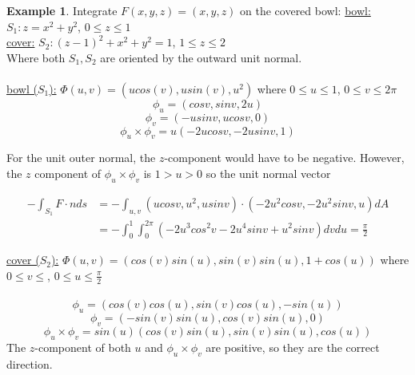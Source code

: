 \documentclass[12pt]{article}
\theoremstyle{plain}
\theoremstyle{definition}
\newtheorem{example}[theorem]{Example}
\begin{document}
\begin{example}
	Integrate $F(x,y,z) = (x,y,z)$ on the covered bowl:
	\underline{bowl:} $S_1 : z = x^2 + y^2$, $0 \leq z \leq 1$\\
	\underline{cover:} $S_2 : (z-1)^2 + x^2 + y^2 =1$, $1 \leq z \leq 2$\\
	Where both $S_1, S_2$ are oriented by the outward unit normal.\\
	\\
	\underline{bowl ($S_1$):} $\Phi (u,v) = (ucos(v), usin(v), u^2)$ where $0 \leq u \leq 1$, $0 \leq v \leq 2 \pi$
	$$\phi_u = (cosv, sinv, 2u)$$
	$$\phi_v = (-usinv, ucosv, 0)$$
	$$\phi_u \times \phi_v = u(-2ucosv, -2usinv, 1)$$

	For the unit outer normal, the $z$-component would have to be negative. However, the $z$ component of $\phi_u \times \phi_v$ is $1 > u > 0$ so the unit normal vector

	\begin{align*}
		-\int_{S_1} F \cdot n ds &= - \int_{u,v} (ucosv, u^2, usinv) \cdot (-2u^2 cosv, -2u^2 sinv, u) dA\\
		&= -\int_0^1 \int_0^{2\pi} (-2u^3cos^2 v - 2u^4 sinv + u^2 sinv) dv du = \frac{\pi}{2}
	\end{align*}

	\underline{cover ($S_2$):} $\Phi (u,v) = (cos(v)sin(u), sin(v)sin(u), 1+cos(u))$ where $0\leq v \leq$, $0 \leq u \leq \frac{\pi}{2}$\\
	\\
	$$\phi_u = (cos(v)cos(u),sin(v)cos(u), -sin(u))$$
	$$\phi_v = (-sin(v)sin(u), cos(v)sin(u), 0)$$
	$$\phi_u \times \phi_v =sin(u)(cos(v)sin(u), sin(v)sin(u), cos(u))$$
	The $z$-component of both $u$ and $\phi_u \times \phi_v$ are positive, so they are the correct direction.

\end{example}
\end{document}
